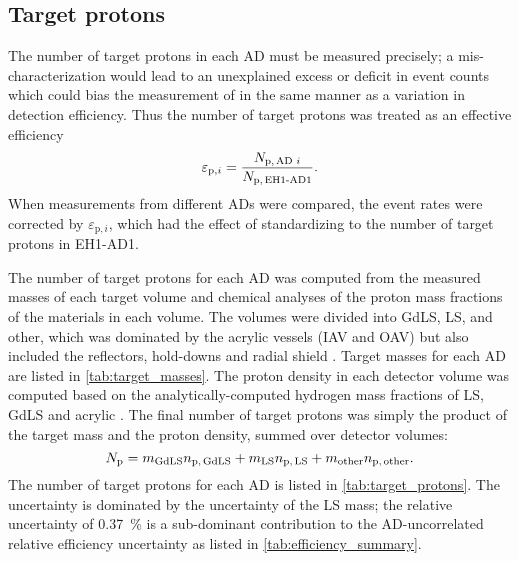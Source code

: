 \subsection{Target protons}
\label{subsec:target_mass}

The number of target protons in each AD must be measured precisely;
a mis-characterization would lead to an unexplained excess or deficit
in event counts which could bias the measurement of \thetaot{}
in the same manner as a variation in detection efficiency.
Thus the number of target protons was treated as an effective efficiency
\begin{equation}\label{eq:target_protons_eff}
    \varepsilon_{\text{p},i} = \frac{N_{\text{p,\,AD }i}}{N_\text{p,\,EH1-AD1}}.
\end{equation}
When measurements from different ADs were compared,
the event rates were corrected by $\varepsilon_{\text{p},i}$,
which had the effect of standardizing to the number of target protons in EH1-AD1.

The number of target protons for each AD was computed from the measured masses
of each target volume
and chemical analyses of the proton mass fractions
of the materials in each volume.
The volumes were divided into GdLS, LS, and other,
which was dominated by the acrylic vessels (IAV and OAV)
but also included the reflectors, hold-downs and radial shield \cite{acrylic_mass}.
Target masses for each AD are listed in \cref{tab:target_masses}.
The proton density in each detector volume
was computed based on the analytically-computed
hydrogen mass fractions of LS, GdLS and acrylic \cite{target_protons_technote}.
The final number of target protons was
simply the product of the target mass and the proton density,
summed over detector volumes:
\begin{equation}\label{eq:target_protons}
    N_\text{p} = m_\text{GdLS} n_\text{p,\,GdLS}
    + m_\text{LS} n_\text{p,\,LS}
    + m_\text{other} n_\text{p,\,other}.
\end{equation}
The number of target protons for each AD
is listed in \cref{tab:target_protons}.
The uncertainty is dominated by the uncertainty of the LS mass;
the relative uncertainty of \SI{0.37}{\percent}
is a sub-dominant contribution to the AD-uncorrelated
relative efficiency uncertainty
as listed in \cref{tab:efficiency_summary}.


